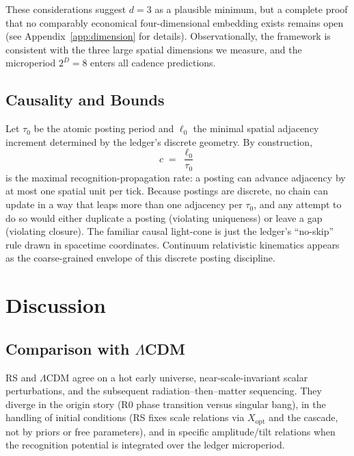 \documentclass[11pt]{article}
\theoremstyle{definition}
\theoremstyle{remark}
\begin{document}
These considerations suggest \(d=3\) as a plausible minimum, but a complete proof that no comparably economical four-dimensional embedding exists remains open (see Appendix~\ref{app:dimension} for details). Observationally, the framework is consistent with the three large spatial dimensions we measure, and the microperiod \(2^D=8\) enters all cadence predictions.

\subsection{Causality and Bounds}
Let \(\tau_0\) be the atomic posting period and \(\ell_0\) the minimal spatial adjacency increment determined by the ledger’s discrete geometry. By construction,
\[
c \;=\; \frac{\ell_0}{\tau_0}
\]
is the maximal recognition-propagation rate: a posting can advance adjacency by at most one spatial unit per tick. Because postings are discrete, no chain can update in a way that leaps more than one adjacency per \(\tau_0\), and any attempt to do so would either duplicate a posting (violating uniqueness) or leave a gap (violating closure). The familiar causal light-cone is just the ledger’s “no-skip” rule drawn in spacetime coordinates. Continuum relativistic kinematics appears as the coarse-grained envelope of this discrete posting discipline.

\section{Discussion}

\subsection{Comparison with \(\Lambda\)CDM}
RS and \(\Lambda\)CDM agree on a hot early universe, near-scale-invariant scalar perturbations, and the subsequent radiation–then–matter sequencing. They diverge in the origin story (R0 phase transition versus singular bang), in the handling of initial conditions (RS fixes scale relations via \(X_{\mathrm{opt}}\) and the cascade, not by priors or free parameters), and in specific amplitude/tilt relations when the recognition potential is integrated over the ledger microperiod.
\end{document}
